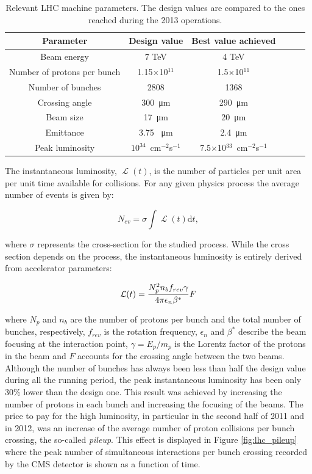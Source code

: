 \begin{table}[h!]
   \centering
  \caption{Relevant LHC machine parameters. The design values are compared to the ones reached during the 2013 operations.}
\begin{tabular}{c|ccccc}
\hline
Parameter & Design value&  Best value achieved \\ 
\hline
Beam energy   & 7 TeV & 4 TeV \\ 
Number of protons per bunch & 1.15$\times$10$^{11}$ & 1.5$\times$10$^{11}$ \\
Number of bunches & 2808 & 1368 \\
Crossing angle & 300~\si{\micro\metre} & 290~\si{\micro\metre} \\
Beam size & 17~\si{\micro\metre} & 20~\si{\micro\metre} \\
Emittance & 3.75 ~\si{\micro\metre} & 2.4~\si{\micro\metre}  \\
Peak luminosity & $10^{34}$~cm$^{-2}$s$^{-1}$ & 7.5$\times$10$^{33}$~cm$^{-2}$s$^{-1}$ \\
\hline
\end{tabular}
  \label{tab:lhc_figures}                
\end{table}


The instantaneous luminosity, $\operatorname{\mathcal{L}}(t)$, is the number of particles per unit area per unit time available for collisions. For any given physics process the average number of events is given by:

\begin{equation} 
	N_{ev} = \sigma\int\operatorname{\mathcal{L}}(t)\mathrm{d}t,
	\label{eq:n_events}
\end{equation} 

where $\sigma$ represents the cross-section for the studied process. While the cross section depends on the process, the instantaneous luminosity is entirely derived from accelerator parameters:

\begin{equation} 
	\operatorname{{\cal L}}(t) = \frac{N_p^2 n_b f_{rev} \gamma }{4 \pi \epsilon_{n} \beta^*} F
	\label{eq:lumi}
\end{equation} 

where $N_p$ and $n_b$ are the number of protons per bunch and the total number of bunches, respectively, $f_{rev}$ is the rotation frequency, $\epsilon_{n}$ and $\beta^*$ describe the beam focusing at the interaction point, $\gamma = E_p / m_p$ is the Lorentz factor of the protons in the beam and $F$ accounts for the crossing angle between the two beams. Although the number of bunches has always been less than half the design value during all the running period, the peak instantaneous luminosity has been only 30\% lower than the design one. This result was achieved by increasing the number of protons in each bunch and increasing the focusing of the beams. The price to pay for the high luminosity, in particular in the second half of 2011 and in 2012, was an increase of the average number of proton collisions per bunch crossing, the so-called \emph{pileup}. This effect is displayed in Figure \ref{fig:lhc_pileup} where the peak number of simultaneous interactions per bunch crossing recorded by the CMS detector is shown as a function of time.


